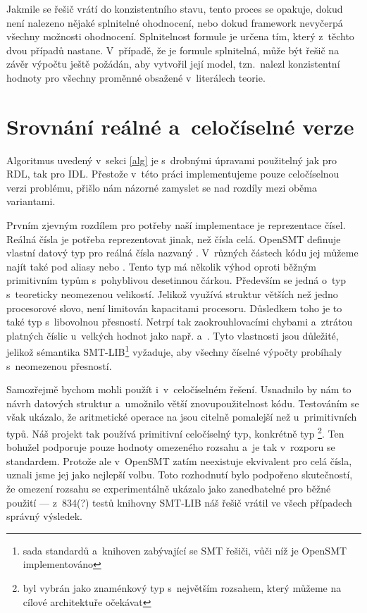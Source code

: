 Jakmile se řešič vrátí do konzistentního stavu, tento proces se opakuje, dokud není nalezeno nějaké splnitelné ohodnocení, nebo dokud framework nevyčerpá všechny možnosti ohodnocení. Splnitelnost formule je určena tím, který z~těchto dvou případů nastane. V~případě, že je formule splnitelná, může být řešič na závěr výpočtu ještě požádán, aby vytvořil její model, tzn.~nalezl konzistentní hodnoty pro všechny proměnné obsažené v~literálech teorie.

\section{Srovnání reálné a~celočíselné verze} \label{int_v_real}

Algoritmus uvedený v~sekci \ref{alg} je s~drobnými úpravami použitelný jak pro RDL, tak pro IDL. Přestože v~této práci implementujeme pouze celočíselnou verzi problému, přišlo nám názorné zamyslet se nad rozdíly mezi oběma variantami.


Prvním zjevným rozdílem pro potřeby naší implementace je reprezentace čísel. Reálná čísla je potřeba reprezentovat jinak, než čísla celá. OpenSMT definuje vlastní datový typ pro reálná čísla nazvaný . V~různých částech kódu jej můžeme najít také pod aliasy  nebo . Tento typ má několik výhod oproti běžným primitivním typům s~pohyblivou desetinnou čárkou. Především se jedná o~typ s~teoreticky neomezenou velikostí. Jelikož využívá struktur větších než jedno procesorové slovo, není limitován kapacitami procesoru. Důsledkem toho je to také typ s~libovolnou přesností. Netrpí tak zaokrouhlovacími chybami a~ztrátou platných číslic u~velkých hodnot jako např.  a~. Tyto vlastnosti jsou důležité, jelikož sémantika SMT-LIB\footnote{sada standardů a~knihoven zabývající se SMT řešiči, vůči níž je OpenSMT implementováno} vyžaduje, aby všechny číselné výpočty probíhaly s~neomezenou přesností.

Samozřejmě bychom mohli  použít i~v~celočíselném řešení. Usnadnilo by nám to návrh datových struktur a~umožnilo větší znovupoužitelnost kódu. Testováním se však ukázalo, že aritmetické operace na  jsou citelně pomalejší než u~primitivních typů. Náš projekt tak používá primitivní celočíselný typ, konkrétně typ \footnote{ byl vybrán jako znaménkový typ s~největším rozsahem, který můžeme na cílové architektuře očekávat}. Ten bohužel podporuje pouze hodnoty omezeného rozsahu a~je tak v~rozporu se standardem. Protože ale v~OpenSMT zatím neexistuje ekvivalent  pro celá čísla, uznali jsme jej jako nejlepší volbu. Toto rozhodnutí bylo podpořeno skutečností, že omezení rozsahu se experimentálně ukázalo jako zanedbatelné pro běžné použití --- z~834(?) %
testů knihovny SMT-LIB náš řešič vrátil ve všech případech správný výsledek.

